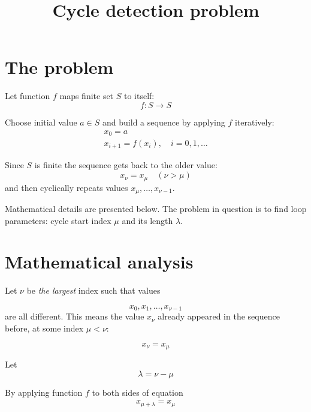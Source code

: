 \documentclass[12pt,a4paper]{article}
\theoremstyle{plain}
\begin{document}
\title{Cycle detection problem}
\author{}
\date{}
\maketitle

\section{The problem}

Let function $ f $ maps finite set $ S $ to itself: 
\begin{equation}
f: S \to S
\end{equation}

Choose initial value $ a \in S $ and build a sequence by applying $ f $ iteratively:
\begin{gather}
x_0 = a \\
x_{i+1} = f(x_i), \quad i = 0, 1, \ldots
\end{gather}

Since $ S $ is finite the sequence gets back to the older value:
\begin{equation}
x_{\nu} = x_{\mu} \quad (\nu > \mu)
\end{equation}
and then cyclically repeats values $ x_{\mu}, \ldots, x_{\nu-1} $.

Mathematical details are presented below. The problem in question is to find loop parameters: cycle start index $ \mu $ and its length $ \lambda $.

\section{Mathematical analysis}

Let $ \nu $ be \emph{the largest} index such that values

\begin{equation}
x_0, x_1, \ldots, x_{\nu-1}
\end{equation}
are all different. This means the value $ x_{\nu} $ already appeared in the sequence before, at some index $ \mu < \nu $:

\begin{equation}
x_{\nu} = x_{\mu}
\end{equation}

Let
\begin{equation}
\lambda = \nu - \mu
\end{equation}

By applying function $ f $ to both sides of equation
\begin{gather}
x_{\mu + \lambda} = x_{\mu}
\end{gather}
\end{document}
